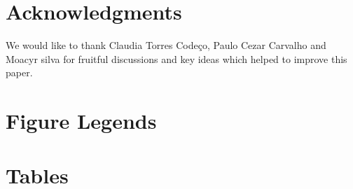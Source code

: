 \documentclass[10pt]{article}
\begin{document}
\section*{Acknowledgments}
We would like to thank Claudia Torres Codeço, Paulo Cezar Carvalho and Moacyr silva for fruitful discussions and key ideas which helped to improve this paper.



\section*{Figure Legends}


\section*{Tables}
\end{document}
